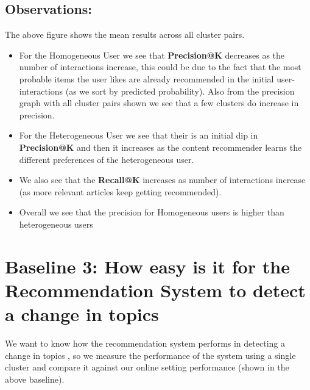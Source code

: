 \documentclass[a4paper,fontsize=8.0pt]{scrartcl}
\begin{document}
\subsection{Observations:}
\begin{flushleft}
The above figure shows the mean results across all cluster pairs.
\begin{itemize}
    \item For the Homogeneous User we see that \textbf{Precision@K} decreases as the number of interactions increase, this could be due to the fact that the most probable items the user likes are already recommended in the initial user-interactions (as we sort by predicted probability). Also from the precision graph with all cluster pairs shown we see that a few clusters do increase in precision.
    \item For the Heterogeneous User we see that their is an initial dip in \textbf{Precision@K} and then it increases as the content recommender learns the different preferences of the heterogeneous user.
    \item We also see that the \textbf{Recall@K} increases as number of interactions increase (as more relevant articles keep getting recommended).
    \item Overall we see that the precision for Homogeneous users is higher than heterogeneous users
\end{itemize}
\end{flushleft}


\vspace{-1ex}
\newpage
\section{Baseline 3: How easy is it for the Recommendation System to detect a change in topics}
\begin{flushleft}
We want to know how the recommendation system performs in detecting a change in topics , so we measure the performance of the system using a single cluster and compare it against our online setting performance (shown in the above baseline). 
\end{flushleft}
\end{document}
